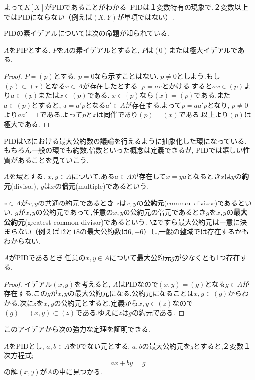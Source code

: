よって$K[X]$がPIDであることがわかる. PIDは１変数特有の現象で,２変数以上ではPIDにならない（例えば$(X,Y)$が単項ではない）.

PIDの素イデアルについては次の命題が知られている.
\begin{prop}
	$A$をPIPとする. $P$を$A$の素イデアルとすると, $P$は$(0)$または極大イデアルである.
\end{prop}
\begin{proof}
	$P=(p)$とする. $p=0$なら示すことはない. $p\neq0$としよう.もし$(p)\subset (x)$となる$x\in A$が存在したとする. $p=ax$とかける.すると$ax\in (p)$より$a\in (p)$または$x\in (p)$である.  $x\in (p)$なら$(x)=(p)$である.また$a\in (p)$とすると, $a=a'p$となる$a'\in A$が存在する.よって$p=aa'p$となり, $p\neq0$より$aa'=1$である.よって$p$と$x$は同伴であり$(p)=(x)$である.以上より$(p)$は極大である.
\end{proof}

PIDは$\Z$における最大公約数の議論を行えるように抽象化した環になっている.もちろん一般の環でも約数,倍数といった概念は定義できるが, PIDでは嬉しい性質があることを見ていこう. 

\begin{defi}[約元,倍元]
	$A$を環とする. $x,y\in A$について,ある$a\in A$が存在して$x=ya$となるとき$x$は$y$の\textbf{約元}(divisor), $y$は$x$の\textbf{倍元}(multiple)であるという.
\end{defi}

$z\in A$が$x,y$の共通の約元であるとき $z$は$x,y$の\textbf{公約元}(common divisor)であるといい, $g$が$x,y$の公約元であって,任意の$x,y$の公約元の倍元であるとき$g$を$x,y$の\textbf{最大公約元}(greatest common divisor)であるという. $\Z$ですら最大公約元は一意に決まらない（例えば$12$と$18$の最大公約数は$6,-6$）し,一般の整域では存在するかもわからない.

\begin{prop}
	$A$がPIDであるとき,任意の$x,y\in A$について最大公約元$g$が少なくとも1つ存在する.
\end{prop}

\begin{proof}
	イデアル$(x,y)$を考えると, $A$はPIDなので$(x,y)=(g)$となる$g\in A$が存在する.この$g$が$x,y$の最大公約元になる.公約元になることは$x,y\in(g)$からわかる.次に$z$を$x,y$の公約元とすると,定義から$x,y\in (z)$なので$(g)=(x,y)\subset (z)$である.ゆえに$z$は$g$の約元である.
\end{proof}

このアイデアから次の強力な定理を証明できる.
\begin{thm}
	$A$をPIDとし, $a,b\in A$を0でない元とする. $a,b$の最大公約元を$g$とすると,２変数１次方程式;
	\[ax+by=g\]
	の解$(x,y)$が$A$の中に見つかる.
\end{thm}

